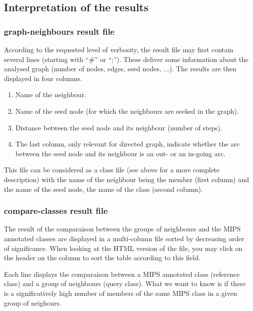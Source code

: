 \subsection{Interpretation of the results}

\subsubsection{graph-neighbours result file}

According to the requested level of verbosity, the result file may
first contain several lines (starting with ``\#'' or ``;''). These
deliver some information about the analysed graph (number of nodes,
edges, seed nodes, ...).  The results are then displayed in four
columns.

\begin{enumerate}
 \item Name of the neighbour.
 \item Name of the seed node (for which the neighbours are seeked in the graph).
 \item Distance between the seed node and its neighbour (number of
   steps).
 \item The last column, only relevant for directed graph, indicate
   whether the arc between the seed node and its neighbour is an out-
   or an in-going arc.
\end{enumerate}

This file can be considered as a class file (see above for a more
complete description) with the name of the neighbour being the member
(first column) and the name of the seed node, the name of the class
(second column).

\subsubsection{compare-classes result file}

The result of the comparaison between the groups of neighbours and the
MIPS annotated classes are displayed in a multi-column file sorted by
decreasing order of significance. When looking at the HTML version of
the file, you may click on the header on the column to sort the table
according to this field.

Each line displays the comparaison between a MIPS annotated class
(reference class) and a group of neighbours (query class). What we
want to know is if there is a significatively high number of members
of the same MIPS class in a given group of neighours.

